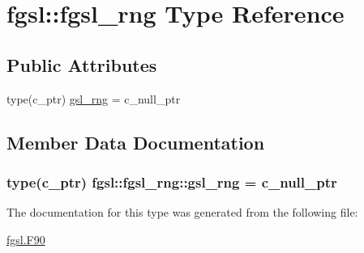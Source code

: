 \hypertarget{structfgsl_1_1fgsl__rng}{}\section{fgsl\+:\+:fgsl\+\_\+rng Type Reference}
\label{structfgsl_1_1fgsl__rng}
\subsection*{Public Attributes}
\begin{DoxyCompactItemize}
\item 
type(c\+\_\+ptr) \hyperlink{structfgsl_1_1fgsl__rng_a4b9983fa868bf2f9d49799977fb8df32}{gsl\+\_\+rng} = c\+\_\+null\+\_\+ptr
\end{DoxyCompactItemize}


\subsection{Member Data Documentation}
\hypertarget{structfgsl_1_1fgsl__rng_a4b9983fa868bf2f9d49799977fb8df32}{}
\subsubsection[{gsl\+\_\+rng}]{\setlength{\rightskip}{0pt plus 5cm}type(c\+\_\+ptr) fgsl\+::fgsl\+\_\+rng\+::gsl\+\_\+rng = c\+\_\+null\+\_\+ptr}\label{structfgsl_1_1fgsl__rng_a4b9983fa868bf2f9d49799977fb8df32}


The documentation for this type was generated from the following file\+:\begin{DoxyCompactItemize}
\item 
\hyperlink{fgsl_8F90}{fgsl.\+F90}\end{DoxyCompactItemize}
